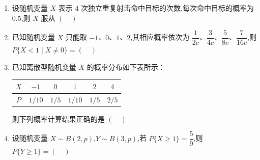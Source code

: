 \begin{enumerate}
\item 设随机变量 $X$ 表示 $4$ 次独立重复射击命中目标的次数,每次命中目标的概率为 $0.5$,则 $X$ 服从 $(\quad)$
\item 已知随机变量 $X$ 只能取 $-1$、$0$、$1$、$2$,其相应概率依次为 $\dfrac{1}{2c}$、$\dfrac{3}{4c}$、$\dfrac{5}{8c}$、$\dfrac{7}{16c}$,则 $P\{X<1 \mid X\neq 0\}=(\quad)$
\item 已知离散型随机变量 $X$ 的概率分布如下表所示：
\begin{center}
\begin{tabular}{c|ccccc}
\toprule
$X$ & $-1$ & $0$ & $1$ & $2$ & $4$ \\
\midrule
$P$ & $1/10$ & $1/5$ & $1/10$ & $1/5$ & $2/5$ \\
\bottomrule
\end{tabular}
\end{center}
则下列概率计算结果正确的是 $(\quad)$
\item 设随机变量 $X\sim B(2,p)$,$Y\sim B(3,p)$,若 $P\{X\ge 1\}=\dfrac{5}{9}$,则 $P\{Y\ge 1\}=(\quad)$
\end{enumerate}
